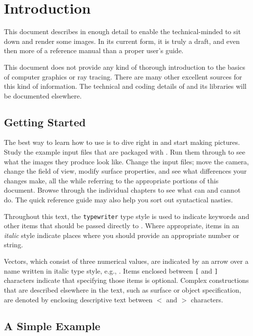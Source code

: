 \chapter{Introduction}

This document describes {\rayshade} in enough detail to enable
the technical-minded to
sit down and render some images.  In its current form,
it is truly a draft, and even then
more of a reference manual than a proper user's guide.

This document does not provide any kind of thorough introduction
to the basics of computer graphics or ray tracing.
There are many other excellent sources for this kind of information.
The technical and coding details of {\rayshade} and
its libraries will be documented elsewhere.

\section{Getting Started}

The best way to learn how to use {\rayshade} is to dive right in and
start making pictures.  Study the example
input files that are packaged with {\rayshade}.  Run them through
{\rayshade} to see what the images they produce look like.
Change the input files; move the camera,
change the field of view, modify surface properties, and see what differences
your changes make, all the while referring to the appropriate portions
of this document.  Browse through the individual chapters
to see what {\rayshade} can and cannot do.  The {\rayshade} quick reference
guide may also help you sort out syntactical nasties.

Throughout this text, the {\tt typewriter} type style is used to indicate
keywords and other items that should be passed
directly to {\rayshade}.  Where appropriate,
items in an {\em italic\/} style indicate
places where you should provide an appropriate number or string.

Vectors, which consist of three numerical values, are indicated by
an arrow over a name written in italic type style, e.g., .
Items enclosed between {\tt [} and {\tt ]} characters indicate
that specifying those items is optional.
Complex constructions that are
described elsewhere in the text, such as surface or object specification,
are denoted by enclosing descriptive text between 
{\tt $<$} and {\tt $>$} characters.

\section{A Simple Example}

